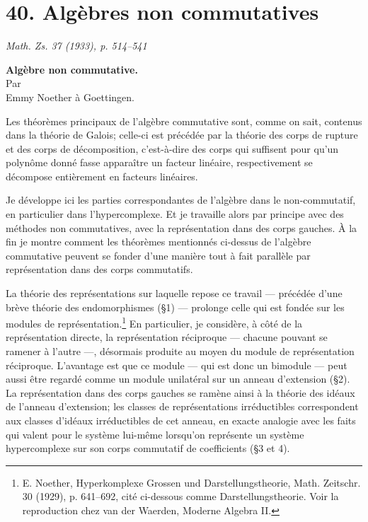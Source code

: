 \providecommand{\frA}{\mathfrak A}
\providecommand{\frB}{\mathfrak B}
\providecommand{\frC}{\mathfrak C}
\providecommand{\frR}{\mathfrak R}
\providecommand{\frS}{\mathfrak S}
\providecommand{\frT}{\mathfrak T}
\providecommand{\frM}{\mathfrak M}
\providecommand{\frG}{\mathfrak G}
\providecommand{\frako}{\mathfrak o}

\section*{40. Algèbres non commutatives}

\begin{center}
\emph{Math. Zs. 37 (1933), p. 514--541}
\end{center}

\begin{center}
\textbf{Algèbre non commutative.}\\[0.5em]
Par\\[0.25em]
Emmy Noether à Goettingen.
\end{center}

Les théorèmes principaux de l'algèbre commutative sont, comme on sait, contenus dans la théorie de Galois; celle-ci est précédée par la théorie des corps de rupture et des corps de décomposition, c'est-à-dire des corps qui suffisent pour qu'un polynôme donné fasse apparaître un facteur linéaire, respectivement se décompose entièrement en facteurs linéaires.

Je développe ici les parties correspondantes de l'algèbre dans le non-commutatif, en particulier dans l'hypercomplexe. Et je travaille alors par principe avec des méthodes non commutatives, avec la représentation dans des corps gauches. À la fin je montre comment les théorèmes mentionnés ci-dessus de l'algèbre commutative peuvent se fonder d'une manière tout à fait parallèle par représentation dans des corps commutatifs.

La théorie des représentations sur laquelle repose ce travail --- précédée d'une brève théorie des endomorphismes (\S 1) --- prolonge celle qui est fondée sur les modules de représentation.\footnote{E. Noether, Hyperkomplexe Grossen und Darstellungstheorie, Math. Zeitschr. 30 (1929), p. 641--692, cité ci-dessous comme Darstellungstheorie. Voir la reproduction chez van der Waerden, Moderne Algebra II.} En particulier, je considère, à côté de la représentation directe, la représentation réciproque --- chacune pouvant se ramener à l'autre ---, désormais produite au moyen du module de représentation réciproque. L'avantage est que ce module --- qui est donc un bimodule --- peut aussi être regardé comme un module unilatéral sur un anneau d'extension (\S 2). La représentation dans des corps gauches se ramène ainsi à la théorie des idéaux de l'anneau d'extension; les classes de représentations irréductibles correspondent aux classes d'idéaux irréductibles de cet anneau, en exacte analogie avec les faits qui valent pour le système lui-même lorsqu'on représente un système hypercomplexe sur son corps commutatif de coefficients (\S 3 et 4).

